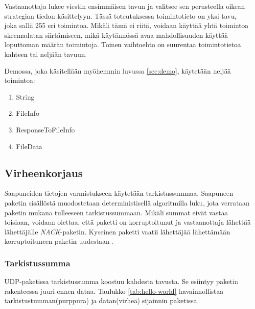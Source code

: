 \documentclass[a4paper,12pt]{article}
\begin{document}
    Vastaanottaja lukee viestin ensimmäisen tavun ja valitsee sen perusteella oikean strategian tiedon käsittelyyn. Tässä toteutuksessa toimintotieto on yksi tavu, joka sallii 255 eri toimintoa. Mikäli tämä ei riitä, voidaan käyttää yhtä toimintoa skeemadatan siirtämiseen, mikä käytännössä avaa mahdollisuuden käyttää loputtoman määrän toimintoja. Toinen vaihtoehto on suurentaa toimintotietoa kahteen tai neljään tavuun. \par

    Demossa, joka käsitellään myöhemmin luvussa \ref{sec:demo}, käytetään neljää toimintoa:
    \begin{enumerate}
        \item String
        \item FileInfo
        \item ResponseToFileInfo
        \item FileData
    \end{enumerate}


    \subsection{Virheenkorjaus}\label{sec:virheenkorjaus}
    Saapuneiden tietojen varmistukseen käytetään tarkistussummaa. Saapuneen paketin sisällöstä muodostetaan deterministisellä algoritmilla luku, jota verrataan paketin mukana tulleeseen tarkistussummaan. Mikäli summat eivät vastaa toisiaan, voidaan olettaa, että paketti on korruptoitunut ja vastaanottaja lähettää lähettäjälle \textit{NACK}-paketin. Kyseinen paketti vaatii lähettäjää lähettämään korruptoituneen paketin uudestaan
    \cite{khan-udp}.

    \subsubsection{Tarkistussumma}

    UDP-paketissa tarkistussumma koostuu kahdesta tavusta. Se esiintyy paketin rakenteessa juuri ennen dataa. Taulukko \ref{tab:hello-world} havainnollistaa tarkistustumman(purppura) ja datan(virheä) sijainnin paketissa.
\end{document}

